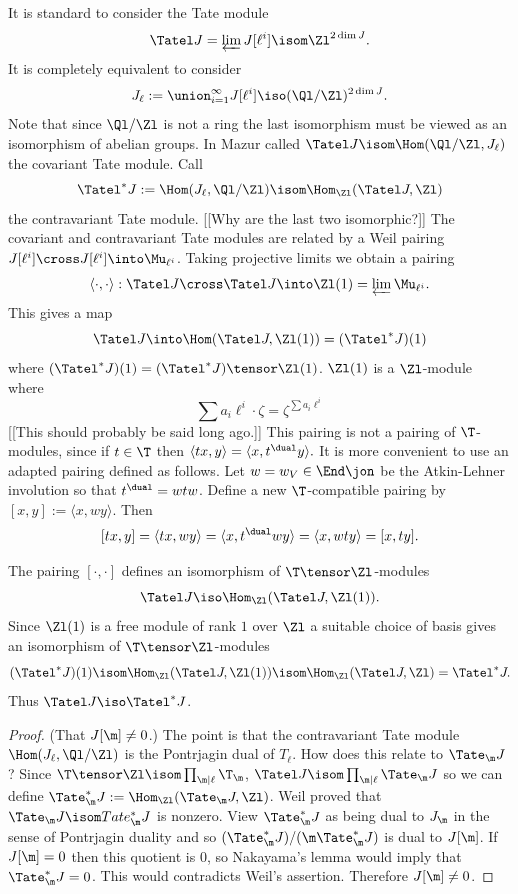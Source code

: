 \documentclass{report}
\begin{document}
It is standard to consider the Tate module
$$\Tatel J=\varprojlim J[\ell^i]\isom \Zl^{2\dim J}.$$
It is completely equivalent to consider
$$J_{\ell}:=\union_{i=1}^{\infty} J[\ell^i]
          \iso(\Ql/\Zl)^{2\dim J}.$$
Note that since $\Ql/\Zl$ is not a ring the last isomorphism
must be viewed as an isomorphism of abelian groups.
In \cite{mazur:eisenstein}
Mazur called $\Tatel J\isom\Hom(\Ql/\Zl,J_{\ell})$
the covariant Tate module. Call
$$\Tatel^* J:=\Hom(J_{\ell},\Ql/\Zl)\isom\Hom_{\Zl}(\Tatel J,\Zl)$$
the contravariant Tate module.
[[Why are the last two isomorphic?]]
The covariant and contravariant Tate modules are related by
a Weil pairing $J[\ell^i]\cross J[\ell^i]\into\Mu_{\ell^i}$.
Taking projective limits we obtain a pairing
$$\langle\cdot,\cdot\rangle:\Tatel J\cross\Tatel J\into\Zl(1)=\varprojlim\Mu_{\ell^i}.$$
This gives a map
$$\Tatel J\into\Hom(\Tatel J,\Zl(1))=(\Tatel^* J)(1)$$
where $(\Tatel^* J)(1)=(\Tatel^*J)\tensor\Zl(1)$.
$\Zl(1)$ is a $\Zl$-module where
$$\sum a_i \ell^i\cdot\zeta=\zeta^{\sum a_i\ell^i}$$
[[This should probably be said long ago.]]
This pairing is not a pairing of $\T$-modules, since
if $t\in\T$ then $\langle tx,y\rangle=\langle x,t^{\dual}y\rangle.$
It is more convenient to use an adapted pairing defined as follows.
Let $w=w_V\in\End\jon$ be the Atkin-Lehner involution so that
$t^{\dual}=wtw$. Define a new $\T$-compatible pairing by
$[x,y]:=\langle x,wy\rangle.$ Then
$$[tx,y]=\langle tx,wy\rangle=\langle x,t^{\dual}wy\rangle
=\langle x,wty\rangle=[x,ty].$$

The pairing $[\cdot,\cdot]$ defines an isomorphism of
$\T\tensor\Zl$-modules
$$\Tatel J\iso \Hom_{\Zl}(\Tatel J,\Zl(1)).$$
Since $\Zl(1)$ is a free module of rank $1$ over $\Zl$
a suitable choice of basis gives an isomorphism
of $\T\tensor\Zl$-modules
$$(\Tatel^* J)(1)\isom\Hom_{\Zl}(\Tatel J, \Zl(1))\isom
\Hom_{\Zl}(\Tatel J,\Zl)=\Tatel^* J.$$
Thus $\Tatel J\iso \Tatel^* J$.

\begin{proof} (That $J[\m]\neq 0$.)
The point is that the contravariant Tate module
$\Hom(J_{\ell},\Ql/\Zl)$ is the Pontrjagin dual of $T_{\ell}$.
How does this relate to $\Tate_{\m}J$?
Since
$\T\tensor\Zl\isom\prod_{\m|\ell}\T_\m$,
$\Tatel J\isom\prod_{\m|\ell}\Tate_{\m} J$ so we can define
$\Tate_\m^*J:=\Hom_{\Zl}(\Tate_\m J,\Zl)$.
Weil proved that $\Tate_\m J\isom Tate_\m^* J$ is nonzero.
View $\Tate_\m^* J$ as being dual to $J_\m$ in the sense
of Pontrjagin duality and so
$(\Tate_\m^*J)/(\m\Tate^*_\m J)$ is dual to $J[\m]$.
If $J[\m]=0$ then this quotient is $0$, so Nakayama's lemma
would imply that $\Tate_\m^* J=0$. This would contradicts
Weil's assertion. Therefore $J[\m]\neq 0$.
\end{proof}
\end{document}
